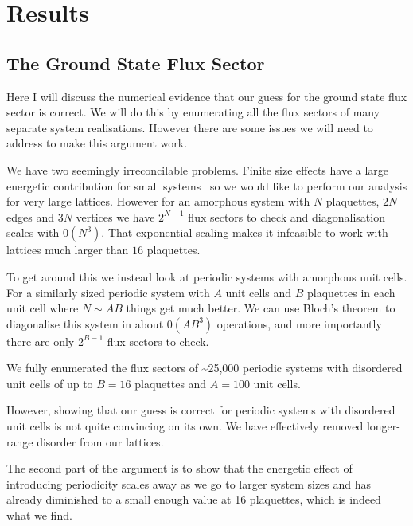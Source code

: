 \hypertarget{amk-results}{%
\section{Results}\label{amk-results}}

\hypertarget{the-ground-state-flux-sector}{%
\subsection{The Ground State Flux Sector}\label{the-ground-state-flux-sector}}

Here I will discuss the numerical evidence that our guess for the ground state flux sector is correct. We will do this by enumerating all the flux sectors of many separate system realisations. However there are some issues we will need to address to make this argument work.

We have two seemingly irreconcilable problems. Finite size effects have a large energetic contribution for small systems~\autocite{kitaevAnyonsExactlySolved2006} so we would like to perform our analysis for very large lattices. However for an amorphous system with \(N\) plaquettes, \(2N\) edges and \(3N\) vertices we have \(2^{N-1}\) flux sectors to check and diagonalisation scales with \(\mathcal{0}(N^3)\). That exponential scaling makes it infeasible to work with lattices much larger than \(16\) plaquettes.

To get around this we instead look at periodic systems with amorphous unit cells. For a similarly sized periodic system with \(A\) unit cells and \(B\) plaquettes in each unit cell where \(N \sim AB\) things get much better. We can use Bloch's theorem to diagonalise this system in about \(\mathcal{0}(A B^3)\) operations, and more importantly there are only \(2^{B-1}\) flux sectors to check.

We fully enumerated the flux sectors of \textasciitilde25,000 periodic systems with disordered unit cells of up to \(B = 16\) plaquettes and \(A = 100\) unit cells.

However, showing that our guess is correct for periodic systems with disordered unit cells is not quite convincing on its own. We have effectively removed longer-range disorder from our lattices.

The second part of the argument is to show that the energetic effect of introducing periodicity scales away as we go to larger system sizes and has already diminished to a small enough value at 16 plaquettes, which is indeed what we find.

